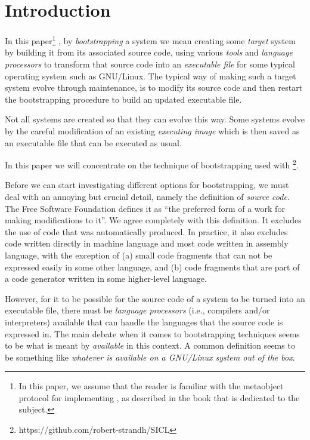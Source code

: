 \section{Introduction}
\label{sec-introduction}

In this paper\footnote{In this paper, we assume that the reader is familiar with the
  metaobject protocol for implementing \clos{}, as described in the
  book \cite{Kiczales:1991:AMP:574212} that is dedicated to the subject.}
, by \emph{bootstrapping} a \commonlisp{} system we mean
creating some \emph{target} \commonlisp{} system by building it from
its associated source code, using various \emph{tools} and
\emph{language processors} to transform that source code into an
\emph{executable file} for some typical operating system such as
GNU/Linux.  The typical way of making such a target \commonlisp{}
system evolve through maintenance, is to modify its source code and
then restart the bootstrapping procedure to build an updated executable
file.

Not all \commonlisp{} systems are created so that they can evolve this
way.  Some systems evolve by the careful modification of an existing
\emph{executing image} which is then saved as an executable file that
can be executed as usual.

In this paper we will concentrate on the technique of bootstrapping
used with \sicl{}%
\footnote{https://github.com/robert-strandh/SICL}.

Before we can start investigating different options for bootstrapping,
we must deal with an annoying but crucial detail, namely the
definition of \emph{source code}.  The Free Software Foundation
defines it as ``the preferred form of a work for making modifications
to it''.  We agree completely with this definition.  It excludes the
use of code that was automatically produced.  In practice, it also
excludes code written directly in machine language and most code
written in assembly language, with the exception of (a) small code
fragments that can not be expressed easily in some other language, and
(b) code fragments that are part of a code generator written in some
higher-level language.

However, for it to be possible for the source code of a \commonlisp{}
system to be turned into an executable file, there must be
\emph{language processors} (i.e., compilers and/or interpreters)
available that can handle the languages that the source code is
expressed in.  The main debate when it comes to bootstrapping
techniques seems to be what is meant by \emph{available} in this
context.  A common definition seems to be something like
\emph{whatever is available on a GNU/Linux system out of the box}.

